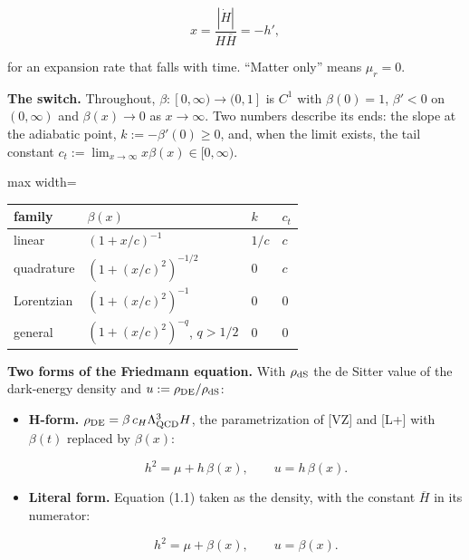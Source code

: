 \documentclass[11pt,a4paper]{article}
\begin{document}
\begin{equation*}
x = \frac{|\dot H|}{H\overline{H}} = -h',
\end{equation*}


for an expansion rate that falls with time. ``Matter only'' means $\mu_r = 0$.

{\bfseries\boldmath The switch.} Throughout, $\beta: [0,\infty) \to (0,1]$ is $C^1$ with $\beta(0) = 1$, $\beta' < 0$ on $(0,\infty)$ and
$\beta(x) \to 0$ as $x \to \infty$. Two numbers describe its ends: the slope at the adiabatic point,
$k := -\beta'(0) \ge 0$, and, when the limit exists, the tail constant $c_t := \lim_{x\to\infty} x\beta(x) \in [0,\infty)$.

\begin{center}
\begin{adjustbox}{max width=\linewidth}
\begin{tabular}{llll}
\hline
{}{\bfseries\boldmath family} & {\bfseries\boldmath $\beta(x)$} & {\bfseries\boldmath $k$} & {\bfseries\boldmath $c_t$} \\
\hline
{}linear & $(1 + x/c)^{-1}$ & $1/c$ & $c$ \\
{}quadrature & $(1 + (x/c)^2)^{-1/2}$ & $0$ & $c$ \\
{}Lorentzian & $(1 + (x/c)^2)^{-1}$ & $0$ & $0$ \\
{}general & $(1 + (x/c)^2)^{-q}$, $q > 1/2$ & $0$ & $0$ \\
\hline
\end{tabular}
\end{adjustbox}
\end{center}

{\bfseries\boldmath Two forms of the Friedmann equation.} With $\rho_{\rm dS}$ the de Sitter value of the dark-energy density and
$u := \rho_{\rm DE}/\rho_{\rm dS}$:

\begin{itemize}
\item{} {\bfseries\boldmath H-form.} $\rho_{\rm DE} = \beta\, c_H\Lambda_{\rm QCD}^3 H$, the parametrization of [VZ] and [L+] with $\beta(t)$ replaced by
$\beta(x)$:

\begin{equation*}
h^2 = \mu + h\,\beta(x), \qquad u = h\,\beta(x). \tag{2.1}
\end{equation*}

\item{} {\bfseries\boldmath Literal form.} Equation (1.1) taken as the density, with the constant $\overline{H}$ in its numerator:

\begin{equation*}
h^2 = \mu + \beta(x), \qquad u = \beta(x). \tag{2.2}
\end{equation*}

\end{itemize}
\end{document}
